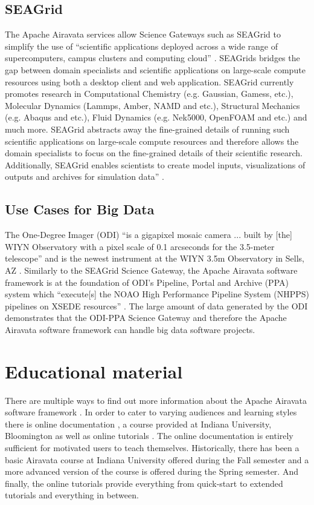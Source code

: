 \documentclass[9pt,twocolumn,twoside]{styles/osajnl}
\begin{document}
\subsection{SEAGrid} \label{seagrid}
The Apache Airavata services allow Science Gateways such as SEAGrid to
simplify the use of ``scientific applications deployed across a wide
range of supercomputers, campus clusters and computing cloud''
\cite{www-seagrid}. SEAGrids bridges the gap between domain
specialists and scientific applications on large-scale compute
resources using both a desktop client and web application. SEAGrid
currently promotes research in Computational Chemistry (e.g. Gaussian,
Gamess, etc.), Molecular Dynamics (Lammps, Amber, NAMD and etc.),
Structural Mechanics (e.g. Abaqus and etc.), Fluid Dynamics
(e.g. Nek5000, OpenFOAM and etc.) and much more. SEAGrid abstracts
away the fine-grained details of running such scientific applications
on large-scale compute resources and therefore allows the domain
specialists to focus on the fine-grained details of their scientific
research. Additionally, SEAGrid enables scientists to create model
inputs, visualizations of outputs and archives for simulation data''
\cite{www-seagrid}.

\subsection{Use Cases for Big Data} \label{big}
The One-Degree Imager (ODI) ``is a gigapixel mosaic camera ... built
by [the] WIYN Observatory with a pixel scale of 0.1 arcseconds for the
3.5-meter telescope'' and is the newest instrument at the WIYN 3.5m
Observatory in Sells, AZ \cite{www-odi, www-wiyn}. Similarly to the
SEAGrid Science Gateway, the Apache Airavata software framework is at
the foundation of ODI's Pipeline, Portal and Archive (PPA) system
which ``execute[s] the NOAO High Performance Pipeline System (NHPPS)
pipelines on XSEDE resources'' \cite{www-odi}. The large amount of
data generated by the ODI demonstrates that the ODI-PPA Science
Gateway and therefore the Apache Airavata software framework can
handle big data software projects. 

\section{Educational material} \label{educational}
There are multiple ways to find out more information about the Apache
Airavata software framework \cite{www-airavata}. In order to cater to
varying audiences and learning styles there is online documentation
\cite{www-documentation}, a course provided at Indiana University,
Bloomington \cite{www-class} as well as online tutorials
\cite{www-tutorial}. The online documentation is entirely sufficient
for motivated users to teach themselves. Historically, there has been a
basic Airavata course at Indiana University offered during the Fall
semester and a more advanced version of the course is offered during
the Spring semester. And finally, the online tutorials provide
everything from quick-start to extended tutorials and everything in
between.
\end{document}
